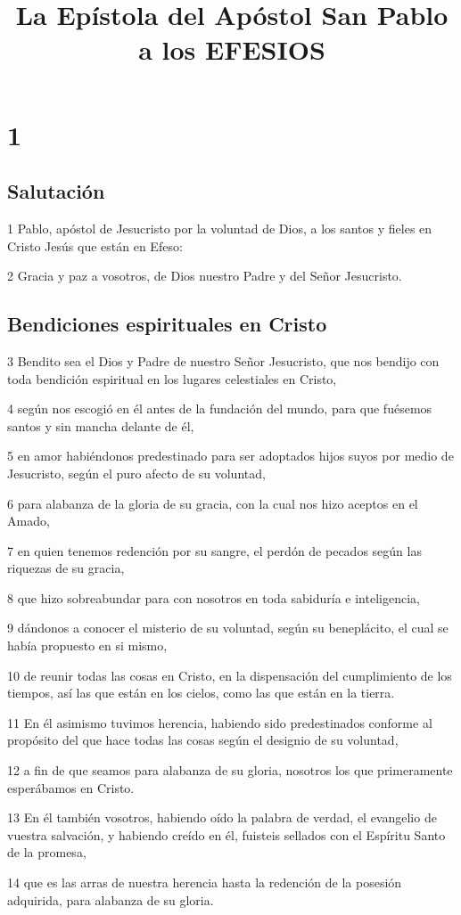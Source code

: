 
\title{La Epístola del Apóstol San Pablo a los EFESIOS}

\chapter{1}

\section*{Salutación}

\par 1 Pablo, apóstol de Jesucristo por la voluntad de Dios, a los santos y fieles en Cristo Jesús que están en Efeso:
\par 2 Gracia y paz a vosotros, de Dios nuestro Padre y del Señor Jesucristo.

\section*{Bendiciones espirituales en Cristo}

\par 3 Bendito sea el Dios y Padre de nuestro Señor Jesucristo, que nos bendijo con toda bendición espiritual en los lugares celestiales en Cristo,
\par 4 según nos escogió en él antes de la fundación del mundo, para que fuésemos santos y sin mancha delante de él,
\par 5 en amor habiéndonos predestinado para ser adoptados hijos suyos por medio de Jesucristo, según el puro afecto de su voluntad,
\par 6 para alabanza de la gloria de su gracia, con la cual nos hizo aceptos en el Amado,
\par 7 en quien tenemos redención por su sangre, el perdón de pecados según las riquezas de su gracia,
\par 8 que hizo sobreabundar para con nosotros en toda sabiduría e inteligencia,
\par 9 dándonos a conocer el misterio de su voluntad, según su beneplácito, el cual se había propuesto en si mismo,
\par 10 de reunir todas las cosas en Cristo, en la dispensación del cumplimiento de los tiempos, así las que están en los cielos, como las que están en la tierra.
\par 11 En él asimismo tuvimos herencia, habiendo sido predestinados conforme al propósito del que hace todas las cosas según el designio de su voluntad,
\par 12 a fin de que seamos para alabanza de su gloria, nosotros los que primeramente esperábamos en Cristo.
\par 13 En él también vosotros, habiendo oído la palabra de verdad, el evangelio de vuestra salvación, y habiendo creído en él, fuisteis sellados con el Espíritu Santo de la promesa,
\par 14 que es las arras de nuestra herencia hasta la redención de la posesión adquirida, para alabanza de su gloria.

